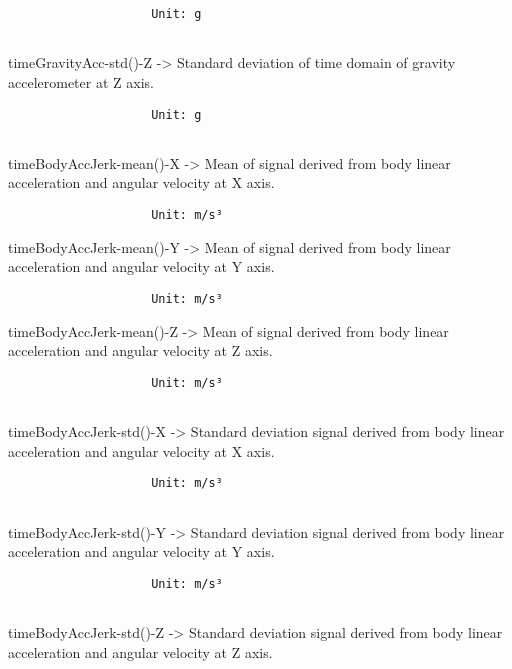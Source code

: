 \documentclass[
]{article}
\begin{document}
\begin{verbatim}
                    Unit: g
                    
\end{verbatim}

timeGravityAcc-std()-Z -\textgreater{} Standard deviation of time domain
of gravity accelerometer at Z axis.

\begin{verbatim}
                    Unit: g
                    
\end{verbatim}

timeBodyAccJerk-mean()-X -\textgreater{} Mean of signal derived from
body linear acceleration and angular velocity at X axis.

\begin{verbatim}
                    Unit: m/s³
\end{verbatim}

timeBodyAccJerk-mean()-Y -\textgreater{} Mean of signal derived from
body linear acceleration and angular velocity at Y axis.

\begin{verbatim}
                    Unit: m/s³
\end{verbatim}

timeBodyAccJerk-mean()-Z -\textgreater{} Mean of signal derived from
body linear acceleration and angular velocity at Z axis.

\begin{verbatim}
                    Unit: m/s³
                    
\end{verbatim}

timeBodyAccJerk-std()-X -\textgreater{} Standard deviation signal
derived from body linear acceleration and angular velocity at X axis.

\begin{verbatim}
                    Unit: m/s³
                    
\end{verbatim}

timeBodyAccJerk-std()-Y -\textgreater{} Standard deviation signal
derived from body linear acceleration and angular velocity at Y axis.

\begin{verbatim}
                    Unit: m/s³
                    
\end{verbatim}

timeBodyAccJerk-std()-Z -\textgreater{} Standard deviation signal
derived from body linear acceleration and angular velocity at Z axis.
\end{document}
